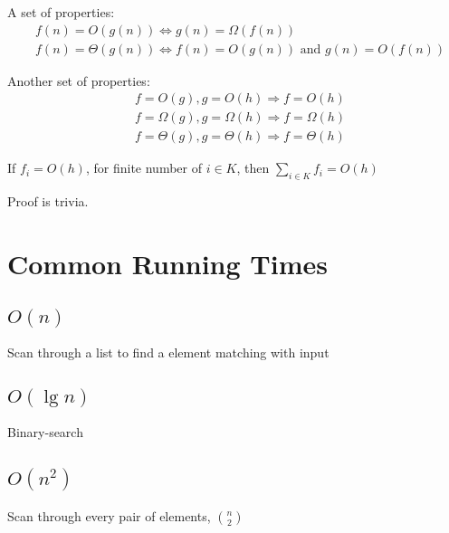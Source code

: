 				A set of properties:
				\begin{align}
					& f(n) = O(g(n)) \iff g(n) = \Omega(f(n))\\
					& f(n) = \Theta(g(n)) \iff f(n) = O(g(n)) \text{ and } g(n) = O(f(n))
				\end{align}

				Another set of properties:
				\begin{align}
					& f = O(g), g = O(h) \Rightarrow f=O(h) \\
					& f = \Omega(g), g = \Omega(h) \Rightarrow f=\Omega(h) \\
					& f = \Theta(g), g = \Theta(h) \Rightarrow f=\Theta(h)
				\end{align}

				\begin{theorem}
					If $f_i = O(h)$, for finite number of $i \in K$, then $\sum_{i\in K} f_i = O(h)$
				\end{theorem}

				Proof is trivia.


		\section{Common Running Times}
			\subsection{\texorpdfstring{$O(n)$}{O(n)}}
				\begin{example}
					Scan through a list to find a element matching with input
				\end{example}

			\subsection{\texorpdfstring{$O(\lg n)$}{O(lgn)}}
				\begin{example}
					Binary-search
				\end{example}

			\subsection{\texorpdfstring{$O(n^2)$}{O(n2)}}
				\begin{example}
					Scan through every pair of elements, $\binom{n}{2}$
				\end{example}

